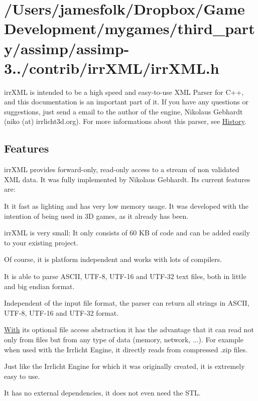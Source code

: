 \hypertarget{_2_users_2jamesfolk_2_dropbox_2_game_development_2mygames_2third_party_2assimp_2assimp-3_81_81_2b1dcc9df1e93e2ac9c863740ad4632a8}{\section{/\+Users/jamesfolk/\+Dropbox/\+Game\+Development/mygames/third\+\_\+party/assimp/assimp-\/3../contrib/irr\+X\+M\+L/irr\+X\+M\+L.\+h}
}
irr\+X\+M\+L is intended to be a high speed and easy-\/to-\/use X\+M\+L Parser for C++, and this documentation is an important part of it. If you have any questions or suggestions, just send a email to the author of the engine, Nikolaus Gebhardt (niko (at) irrlicht3d.\+org). For more informations about this parser, see \hyperlink{irrXML.h_history}{History}.\hypertarget{irrXML.h_features}{}\subsection{Features}\label{irrXML.h_features}
irr\+X\+M\+L provides forward-\/only, read-\/only access to a stream of non validated X\+M\+L data. It was fully implemented by Nikolaus Gebhardt. Its current features are\+:


\begin{DoxyItemize}
\item It it fast as lighting and has very low memory usage. It was developed with the intention of being used in 3\+D games, as it already has been.
\item irr\+X\+M\+L is very small\+: It only consists of 60 K\+B of code and can be added easily to your existing project.
\item Of course, it is platform independent and works with lots of compilers.
\item It is able to parse A\+S\+C\+I\+I, U\+T\+F-\/8, U\+T\+F-\/16 and U\+T\+F-\/32 text files, both in little and big endian format.
\item Independent of the input file format, the parser can return all strings in A\+S\+C\+I\+I, U\+T\+F-\/8, U\+T\+F-\/16 and U\+T\+F-\/32 format.
\item \hyperlink{struct_with}{With} its optional file access abstraction it has the advantage that it can read not only from files but from any type of data (memory, network, ...). For example when used with the Irrlicht Engine, it directly reads from compressed .zip files.
\item Just like the Irrlicht Engine for which it was originally created, it is extremely easy to use.
\item It has no external dependencies, it does not even need the S\+T\+L.
\end{DoxyItemize}

